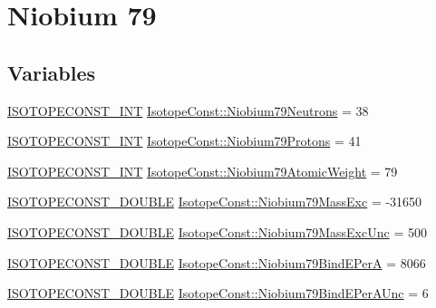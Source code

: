 \hypertarget{group___isotope_const-_niobium-_nb79}{}\section{Niobium 79}
\label{group___isotope_const-_niobium-_nb79}
\subsection*{Variables}
\begin{DoxyCompactItemize}
\item 
\mbox{\hyperlink{group___isotope_const-_macros_ga5f18360b3e99483a35c32d789e62621c}{I\+S\+O\+T\+O\+P\+E\+C\+O\+N\+S\+T\+\_\+\+I\+NT}} \mbox{\hyperlink{group___isotope_const-_niobium-_nb79_gaa8871cfbd72289153baecaeb43094da3}{Isotope\+Const\+::\+Niobium79\+Neutrons}} = 38
\item 
\mbox{\hyperlink{group___isotope_const-_macros_ga5f18360b3e99483a35c32d789e62621c}{I\+S\+O\+T\+O\+P\+E\+C\+O\+N\+S\+T\+\_\+\+I\+NT}} \mbox{\hyperlink{group___isotope_const-_niobium-_nb79_ga92a7814b0276540db03d3b99fe50e062}{Isotope\+Const\+::\+Niobium79\+Protons}} = 41
\item 
\mbox{\hyperlink{group___isotope_const-_macros_ga5f18360b3e99483a35c32d789e62621c}{I\+S\+O\+T\+O\+P\+E\+C\+O\+N\+S\+T\+\_\+\+I\+NT}} \mbox{\hyperlink{group___isotope_const-_niobium-_nb79_ga87bc2309d09242d89cc01ec61a09d56f}{Isotope\+Const\+::\+Niobium79\+Atomic\+Weight}} = 79
\item 
\mbox{\hyperlink{group___isotope_const-_macros_ga8f45a7272ce02c0b4c65c44636ed719a}{I\+S\+O\+T\+O\+P\+E\+C\+O\+N\+S\+T\+\_\+\+D\+O\+U\+B\+LE}} \mbox{\hyperlink{group___isotope_const-_niobium-_nb79_ga81aa6ff683a49b9888cd847b05026888}{Isotope\+Const\+::\+Niobium79\+Mass\+Exc}} = -\/31650
\item 
\mbox{\hyperlink{group___isotope_const-_macros_ga8f45a7272ce02c0b4c65c44636ed719a}{I\+S\+O\+T\+O\+P\+E\+C\+O\+N\+S\+T\+\_\+\+D\+O\+U\+B\+LE}} \mbox{\hyperlink{group___isotope_const-_niobium-_nb79_gab7d9df795f2ffe361579253ca6d7c9d0}{Isotope\+Const\+::\+Niobium79\+Mass\+Exc\+Unc}} = 500
\item 
\mbox{\hyperlink{group___isotope_const-_macros_ga8f45a7272ce02c0b4c65c44636ed719a}{I\+S\+O\+T\+O\+P\+E\+C\+O\+N\+S\+T\+\_\+\+D\+O\+U\+B\+LE}} \mbox{\hyperlink{group___isotope_const-_niobium-_nb79_ga5eb8c4735bc2dbc72ed787b8e2724726}{Isotope\+Const\+::\+Niobium79\+Bind\+E\+PerA}} = 8066
\item 
\mbox{\hyperlink{group___isotope_const-_macros_ga8f45a7272ce02c0b4c65c44636ed719a}{I\+S\+O\+T\+O\+P\+E\+C\+O\+N\+S\+T\+\_\+\+D\+O\+U\+B\+LE}} \mbox{\hyperlink{group___isotope_const-_niobium-_nb79_ga0e8e2b462a30aef721b558abf1ef7574}{Isotope\+Const\+::\+Niobium79\+Bind\+E\+Per\+A\+Unc}} = 6

\end{DoxyCompactItemize}
